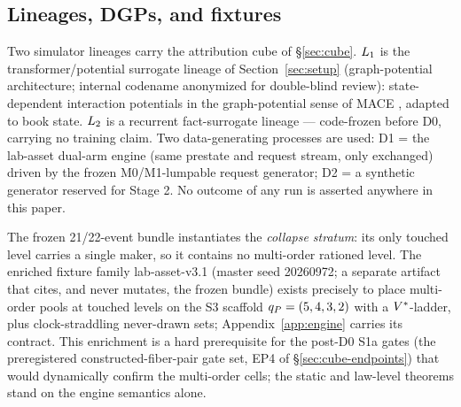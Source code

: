 \subsection{Lineages, DGPs, and fixtures}
\label{sec:lineages}

Two simulator lineages carry the attribution cube of \S\ref{sec:cube}.
$L_{1}$ is the transformer/potential surrogate lineage of
Section~\ref{sec:setup} (graph-potential architecture; internal codename
anonymized for double-blind review): state-dependent
interaction potentials in the graph-potential sense of MACE
\citep{batatia2022}, adapted to book state. $L_{2}$ is a recurrent
fact-surrogate lineage --- code-frozen before D0, carrying no training claim.
Two data-generating processes are used: D1 = the lab-asset dual-arm engine
(same prestate and request stream, only  exchanged)
driven by the frozen M0/M1-lumpable request generator; D2 = a synthetic
generator reserved for Stage 2. No outcome of any run is asserted anywhere in
this paper.

The frozen 21/22-event bundle instantiates the \emph{collapse stratum}: its
only touched level carries a single maker, so it contains no multi-order
rationed level. The enriched fixture family lab-asset-v3.1 (master seed
20260972; a separate artifact that cites, and never mutates, the frozen
bundle) exists precisely to place multi-order pools at touched levels on the
S3 scaffold $q_{P} = (5,4,3,2)$ with a $V^{*}$-ladder, plus clock-straddling
never-drawn sets; Appendix~\ref{app:engine} carries its contract. This
enrichment is a hard prerequisite for the post-D0 S1a gates (the
preregistered constructed-fiber-pair gate set, EP4 of
\S\ref{sec:cube-endpoints}) that would
dynamically confirm the multi-order cells; the static and law-level theorems
stand on the engine semantics alone. \RESULTSPENDING{}
